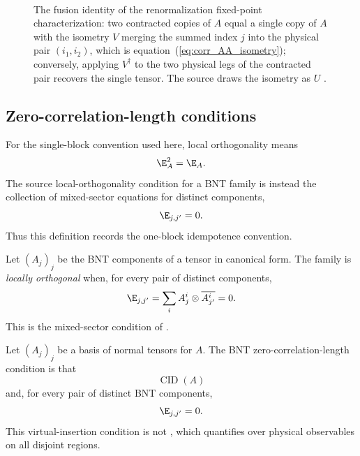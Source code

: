 \begin{figure}[ht]
    \centering
    \TNRFPKrausIsometry\\[10pt]
    \TNRFPKrausIsometryReverse
    \caption{The fusion identity of the renormalization fixed-point
        characterization: two contracted copies of $A$ equal a single copy of
        $A$ with the isometry $V$ merging the summed index $j$ into the
        physical pair $(i_1,i_2)$, which is
        equation~(\ref{eq:corr_AA_isometry}); conversely, applying $V^\dagger$
        to the two physical legs of the contracted pair recovers the single
        tensor. The source draws the isometry as $U$
        \cite[Theorem~3.1, lines~396--412]{Cirac2016MPDO_arXiv}.}
    \label{fig:rfp_kraus_isometry}
\end{figure}

\subsection{Zero-correlation-length conditions}

\begin{definition}%
    \label{def:is_locally_orthogonal}
    \leanok
    For the single-block convention used here, local orthogonality means
    \[
        \E_A^2=\E_A .
    \]
    The source local-orthogonality condition for a BNT family is instead the
    collection of mixed-sector equations for distinct components,
    \[
        \E_{j,j'}=0.
    \]
    Thus this definition records the one-block idempotence convention.
\end{definition}

\begin{definition}%
    \label{def:is_bnt_locally_orthogonal}
    \leanok
    Let $(A_j)_j$ be the BNT components of a tensor in canonical form. The
    family is \emph{locally orthogonal} when, for every pair of distinct
    components,
    \[
        \E_{j,j'}=\sum_i A_j^i\otimes \overline{A_{j'}^i}=0.
    \]
    This is the mixed-sector condition of
    \cite[Definition~3.5]{Cirac2016MPDO_arXiv}.
\end{definition}

\begin{definition}%
    \label{def:is_bnt_zcl}
    \leanok
    Let $(A_j)_j$ be a basis of normal tensors for $A$. The BNT
    zero-correlation-length condition is that
    \[
        \operatorname{CID}(A)
    \]
    and, for every pair of distinct BNT components,
    \[
        \E_{j,j'}=0.
    \]
    This virtual-insertion condition is not
    \cite[Definition~3.6]{Cirac2016MPDO_arXiv}, which quantifies over physical
    observables on all disjoint regions.
\end{definition}

